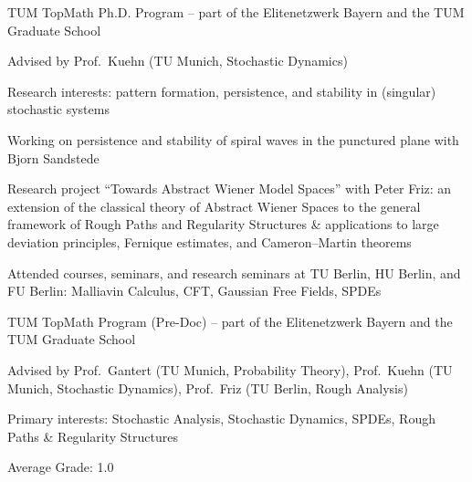 \documentclass[a4paper,8pt]{extarticle}
\begin{document}


\begin{cvitems}
  \item TUM TopMath Ph.D. Program -- part of the Elitenetzwerk Bayern and the TUM Graduate School
  \item Advised by Prof.\ Kuehn (TU Munich, Stochastic Dynamics)
  \item Research interests: pattern formation, persistence, and stability in (singular) stochastic systems
\end{cvitems}

\begin{cvitems}
  \item Working on persistence and stability of spiral waves in the punctured plane with Bjorn Sandstede
\end{cvitems}

\begin{cvitems}
  \item Research project ``Towards Abstract Wiener Model Spaces'' with Peter Friz: an extension of the classical theory of Abstract Wiener Spaces to the general framework of Rough Paths and Regularity Structures \& applications to large deviation principles, Fernique estimates, and Cameron--Martin theorems
  \item Attended courses, seminars, and research seminars at TU Berlin, HU Berlin, and FU Berlin: Malliavin Calculus, CFT, Gaussian Free Fields, SPDEs
\end{cvitems}

\begin{cvitems}
  \item TUM TopMath Program (Pre-Doc) -- part of the Elitenetzwerk Bayern and the TUM Graduate School
  \item Advised by Prof.\ Gantert (TU Munich, Probability Theory), Prof.\ Kuehn (TU Munich, Stochastic Dynamics), Prof.\ Friz (TU Berlin, Rough Analysis)
  \item Primary interests: Stochastic Analysis, Stochastic Dynamics, SPDEs, Rough Paths \& Regularity Structures
  \item Average Grade: 1.0
\end{cvitems}
\end{document}
